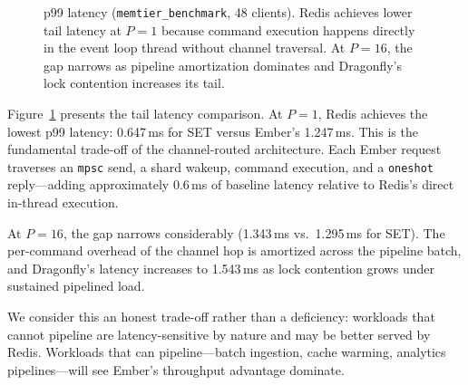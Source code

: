 \documentclass[conference]{IEEEtran}
\begin{document}
\begin{figure}[t]
\centering
{}
\caption{p99 latency (\texttt{memtier\_benchmark}, 48 clients).
Redis achieves lower tail latency at $P{=}1$ because command
execution happens directly in the event loop thread without channel
traversal. At $P{=}16$, the gap narrows as pipeline amortization
dominates and Dragonfly's lock contention increases its tail.}
\label{fig:latency}
\end{figure}

Figure~\ref{fig:latency} presents the tail latency comparison. At
$P{=}1$, Redis achieves the lowest p99 latency: 0.647\,ms for SET
versus Ember's 1.247\,ms. This is the fundamental trade-off of the
channel-routed architecture. Each Ember request traverses an
\texttt{mpsc} send, a shard wakeup, command execution, and a
\texttt{oneshot} reply---adding approximately 0.6\,ms of baseline
latency relative to Redis's direct in-thread execution.

At $P{=}16$, the gap narrows considerably (1.343\,ms vs.\ 1.295\,ms
for SET). The per-command overhead of the channel hop is amortized
across the pipeline batch, and Dragonfly's latency increases to
1.543\,ms as lock contention grows under sustained pipelined load.

We consider this an honest trade-off rather than a deficiency:
workloads that cannot pipeline are latency-sensitive by nature and
may be better served by Redis. Workloads that can pipeline---batch
ingestion, cache warming, analytics pipelines---will see Ember's
throughput advantage dominate.
\end{document}
